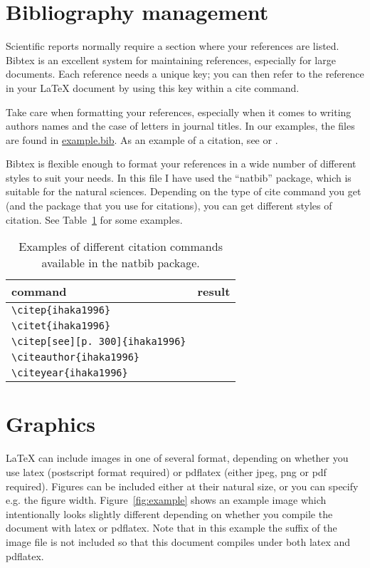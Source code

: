 \documentclass{IEEEtran}
\providecommand*{\latex}{\LaTeX\xspace}
\begin{document}
{\section{Bibliography management}

Scientific reports normally require a section where your references
are listed.  Bibtex is an excellent system for maintaining references,
especially for large documents.  Each reference needs a unique key;
you can then refer to the reference in your \latex document by using
this key within a cite command.

Take care when formatting your references, especially when it comes to
writing authors names and the case of letters in journal titles.  In
our examples, the files are found in \url{example.bib}.  As an example
of a citation, see \citep{ihaka1996} or \citep{ihaka1996,venables1999}.

Bibtex is flexible enough to format your references in a wide number
of different styles to suit your needs.  In this file I have used the
``natbib'' package, which is suitable for the natural sciences.
Depending on the type of cite command you get (and the package that
you use for citations), you can get different styles of citation.  See
Table~\ref{tab:cite} for some examples.

\begin{table}
  \centering
  \begin{tabular}{ll}
    \hline
    command & result\\ \hline
    \verb+\citep{ihaka1996}+ & \citep{ihaka1996}\\
    \verb+\citet{ihaka1996}+ & \citet{ihaka1996}\\
    \verb+\citep[see][p. 300]{ihaka1996}+ &
    \citep[see][p. 300]{ihaka1996}
    \\
    \verb+\citeauthor{ihaka1996}+ & \citeauthor{ihaka1996}
    \\
    \verb+\citeyear{ihaka1996}+ & \citeyear{ihaka1996}
    \\
    \hline
  \end{tabular}
  \caption{Examples of different citation commands available in the
    natbib package.}
  \label{tab:cite}
\end{table}


\section{Graphics}
\label{sec:graphics}

\latex can include images in one of several format, depending on
whether you use latex (postscript format required) or pdflatex (either
jpeg, png or pdf required).  Figures can be included either at their
natural size, or you can specify e.g. the figure width.
Figure~\ref{fig:example} shows an example image which intentionally
looks slightly different depending on whether you compile the document
with latex or pdflatex.  Note that in this example the suffix of the
image file is not included so that this document compiles under both
latex and pdflatex.

}
\end{document}

